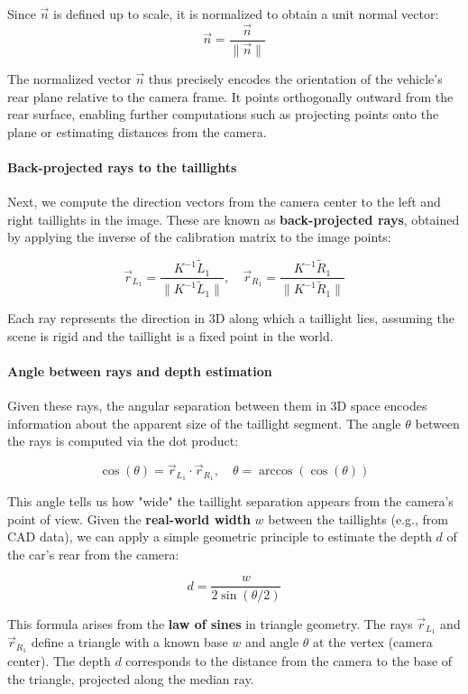 Since \( \vec{n} \) is defined up to scale, it is normalized to obtain a unit normal vector:
\[
\vec{n} = \frac{\vec{n}}{\|\vec{n}\|}
\]

The normalized vector \( \vec{n} \) thus precisely encodes the orientation of the vehicle’s rear plane relative to the camera frame. It points orthogonally outward from the rear surface, enabling further computations such as projecting points onto the plane or estimating distances from the camera.


\paragraph{Back-projected rays to the taillights}

Next, we compute the direction vectors from the camera center to the left and right taillights in the image. These are known as \textbf{back-projected rays}, obtained by applying the inverse of the calibration matrix to the image points:

\[
\vec{r}_{L_1} = \frac{K^{-1} \tilde{L}_1}{\|K^{-1} \tilde{L}_1\|}, \quad 
\vec{r}_{R_1} = \frac{K^{-1} \tilde{R}_1}{\|K^{-1} \tilde{R}_1\|}
\]

Each ray represents the direction in 3D along which a taillight lies, assuming the scene is rigid and the taillight is a fixed point in the world.

\paragraph{Angle between rays and depth estimation}

Given these rays, the angular separation between them in 3D space encodes information about the apparent size of the taillight segment. The angle \( \theta \) between the rays is computed via the dot product:

\[
\cos(\theta) = \vec{r}_{L_1} \cdot \vec{r}_{R_1}, \quad 
\theta = \arccos(\cos(\theta))
\]

This angle tells us how "wide" the taillight separation appears from the camera’s point of view. Given the \textbf{real-world width} \( w \) between the taillights (e.g., from CAD data), we can apply a simple geometric principle to estimate the depth \( d \) of the car's rear from the camera:

\[
d = \frac{w}{2 \sin(\theta / 2)}
\]

This formula arises from the \textbf{law of sines} in triangle geometry. The rays \( \vec{r}_{L_1} \) and \( \vec{r}_{R_1} \) define a triangle with a known base \( w \) and angle \( \theta \) at the vertex (camera center). The depth \( d \) corresponds to the distance from the camera to the base of the triangle, projected along the median ray.

